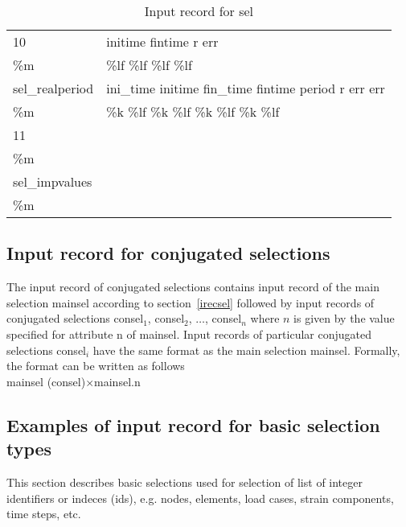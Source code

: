 \begin{table}[!p]
\begin{center}
\begin{tabular}{||l|l||}
\hline
\hline

10                    & {\sf initime fintime r err}      \\
{\sf \%m}             & {\sf \%lf \%lf \%lf \%lf} \\
\cline{1-2}
{\sf sel\_realperiod} & {\sf ini\_time} {\sf initime} {\sf fin\_time} {\sf fintime} {\sf period} {\sf r} {\sf err} {\sf err}      \\
{\sf \%m}             & {\sf \%k \%lf \%k \%lf \%k \%lf \%k \%lf} \\

\hline
\hline

11                   & \\
{\sf \%m}            & \\
\cline{1-2}
{\sf sel\_impvalues} & \\
{\sf \%m}            & \\

\hline
\hline
\end{tabular}
\caption{Input record for {\sf sel}}
\label{tabsel}
\end{center}
\end{table}

\subsection{Input record for conjugated selections}
The input record of conjugated selections contains input record of the main selection
{\sf mainsel} according to section~\ref{irecsel} followed by input records of conjugated
selections {\sf consel$_1$}, {\sf consel$_2$}, $\ldots$, {\sf consel$_n$} where $n$ is
given by the value specified for attribute {\sf n} of {\sf mainsel}. Input records of 
particular conjugated selections {\sf consel$_i$} have the same format as the main selection
{\sf mainsel}. Formally, the format can be written as follows \\

\indent \hspace{20mm} {\sf mainsel} ({\sf consel})$\times${\sf mainsel.n}\\

\subsection {Examples of input record for basic selection types} \label{basicsel_ex}
This section describes basic selections used for selection of list of integer identifiers or 
indeces (ids), e.g. nodes, elements, load cases, strain components, time steps, etc.



